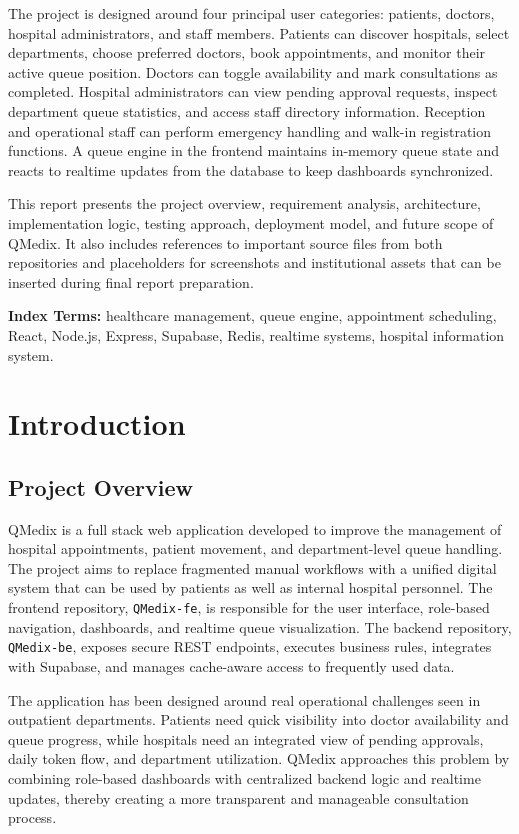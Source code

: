 \documentclass[12pt,onecolumn]{IEEEtran}
\let\oldsection\section
\renewcommand{\section}{\clearpage\oldsection}
\begin{document}
The project is designed around four principal user categories: patients, doctors, hospital administrators, and staff members. Patients can discover hospitals, select departments, choose preferred doctors, book appointments, and monitor their active queue position. Doctors can toggle availability and mark consultations as completed. Hospital administrators can view pending approval requests, inspect department queue statistics, and access staff directory information. Reception and operational staff can perform emergency handling and walk-in registration functions. A queue engine in the frontend maintains in-memory queue state and reacts to realtime updates from the database to keep dashboards synchronized.

This report presents the project overview, requirement analysis, architecture, implementation logic, testing approach, deployment model, and future scope of QMedix. It also includes references to important source files from both repositories and placeholders for screenshots and institutional assets that can be inserted during final report preparation.

\noindent\textbf{Index Terms:} healthcare management, queue engine, appointment scheduling, React, Node.js, Express, Supabase, Redis, realtime systems, hospital information system.

\tableofcontents
\clearpage


\section{Introduction}
\subsection{Project Overview}
QMedix is a full stack web application developed to improve the management of hospital appointments, patient movement, and department-level queue handling. The project aims to replace fragmented manual workflows with a unified digital system that can be used by patients as well as internal hospital personnel. The frontend repository, \texttt{QMedix-fe}, is responsible for the user interface, role-based navigation, dashboards, and realtime queue visualization. The backend repository, \texttt{QMedix-be}, exposes secure REST endpoints, executes business rules, integrates with Supabase, and manages cache-aware access to frequently used data.

The application has been designed around real operational challenges seen in outpatient departments. Patients need quick visibility into doctor availability and queue progress, while hospitals need an integrated view of pending approvals, daily token flow, and department utilization. QMedix approaches this problem by combining role-based dashboards with centralized backend logic and realtime updates, thereby creating a more transparent and manageable consultation process.
\end{document}
